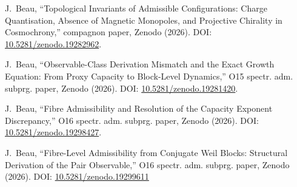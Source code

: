 J.~Beau,
``Topological Invariants of Admissible Configurations: Charge Quantisation, Absence of Magnetic Monopoles, and Projective Chirality in Cosmochrony,''
compagnon paper, Zenodo (2026).
DOI: \href{https://doi.org/10.5281/zenodo.19282962}{10.5281/zenodo.19282962}.

J.~Beau,
``Observable-Class Derivation Mismatch and the Exact Growth Equation: From Proxy Capacity to Block-Level Dynamics,''
O15 spectr. adm. subprg. paper, Zenodo (2026).
DOI: \href{https://doi.org/10.5281/zenodo.19281420}{10.5281/zenodo.19281420}.

J.~Beau,
``Fibre Admissibility and Resolution of the Capacity Exponent Discrepancy,''
O16 spectr. adm. subprg. paper, Zenodo (2026).
DOI: \href{https://doi.org/10.5281/zenodo.19298427}{10.5281/zenodo.19298427}.

J.~Beau,
``Fibre-Level Admissibility from Conjugate Weil Blocks: Structural Derivation of the Pair Observable,''
  O16 spectr. adm. subprg. paper, Zenodo (2026).
  DOI: \href{https://doi.org/10.5281/zenodo.19299611}{10.5281/zenodo.19299611}
